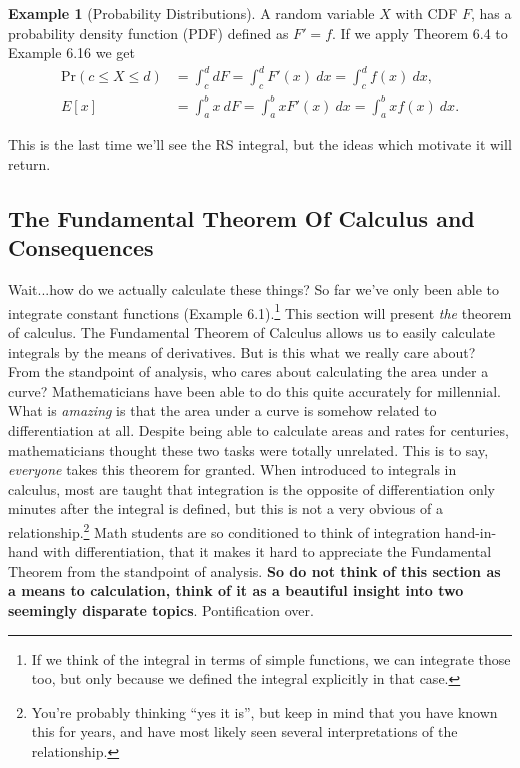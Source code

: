 \documentclass{article}
\newcommand{\Prr}[1]{\text{Pr}\left(#1\right)}
\theoremstyle{definition}
\newtheorem{example}{Example}[section]
\begin{document}
	\begin{example}[Probability Distributions]
		A random variable $ X $ with CDF $ F $, has a probability density function (PDF) defined as $ F'=f $. If we apply Theorem 6.4 to Example 6.16 we get
		\begin{align*}
			\Prr{c\le X\le d}&=\int_{c}^{d} dF=\int_{c}^{d}F'(x)\ dx=\int_{c}^{d}f(x)\ dx,\\
			E[x]&=\int_{a}^{b} x\ dF=\int_{a}^{b}xF'(x)\ dx=\int_{a}^{b}xf(x)\ dx.
		\end{align*}
	\end{example}
	This is the last time we'll see the RS integral, but the ideas which motivate it will return. 
	\subsection{The Fundamental Theorem Of Calculus and Consequences}
	Wait...how do we actually calculate these things? So far we've only been able to integrate constant functions (Example 6.1).\footnote{If we think of the integral in terms of simple functions, we can integrate those too, but only because we  defined the integral explicitly in that case.} This section will present \textit{the} theorem of calculus. The Fundamental Theorem of Calculus allows us to easily calculate integrals by the means of derivatives. But is this what we really care about? From the standpoint of analysis, who cares about calculating the area under a curve? Mathematicians have been able to do this quite accurately for millennial. What is \textit{amazing} is that the area under a curve is somehow related to differentiation at all. Despite being able to calculate areas and rates for centuries, mathematicians thought these two tasks were totally unrelated. This is to say, \textit{everyone} takes this theorem for granted. When introduced to integrals in calculus, most are taught that integration is the opposite of differentiation only minutes after the integral is defined, but this is not a very obvious of a relationship.\footnote{You're probably thinking ``yes it is'', but keep in mind that you have known this for years, and have most likely seen several interpretations of the relationship.} Math students are so conditioned to think of integration hand-in-hand with differentiation, that it makes it hard to appreciate the Fundamental Theorem from the standpoint of analysis. \textbf{So do not think of this section as a means to calculation, think of it as a beautiful insight into two seemingly disparate topics}. Pontification over. 
	
\end{document}
